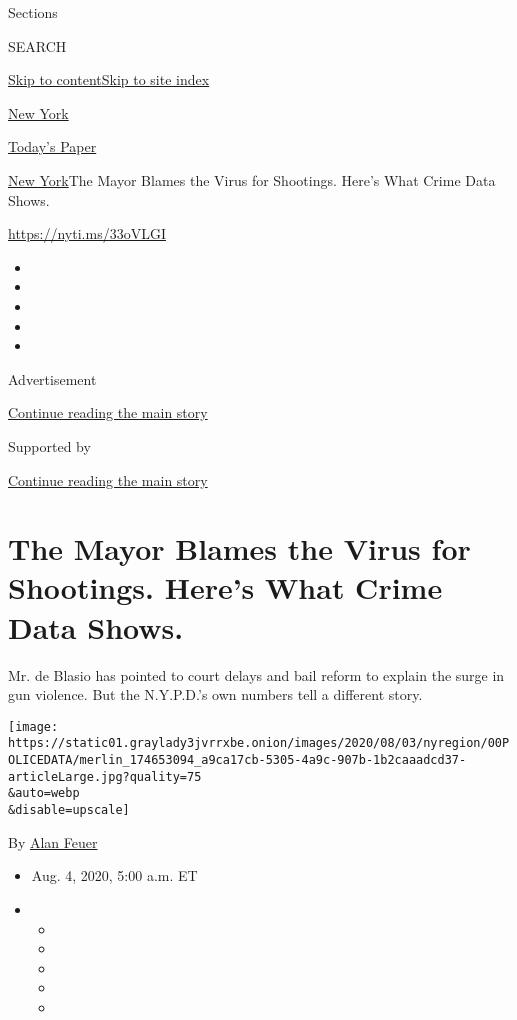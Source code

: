 Sections

SEARCH

\protect\hyperlink{site-content}{Skip to
content}\protect\hyperlink{site-index}{Skip to site index}

\href{https://www.nytimes3xbfgragh.onion/section/nyregion}{New York}

\href{https://myaccount.nytimes3xbfgragh.onion/auth/login?response_type=cookie\&client_id=vi}{}

\href{https://www.nytimes3xbfgragh.onion/section/todayspaper}{Today's
Paper}

\href{/section/nyregion}{New York}\textbar{}The Mayor Blames the Virus
for Shootings. Here's What Crime Data Shows.

\url{https://nyti.ms/33oVLGI}

\begin{itemize}
\item
\item
\item
\item
\item
\end{itemize}

Advertisement

\protect\hyperlink{after-top}{Continue reading the main story}

Supported by

\protect\hyperlink{after-sponsor}{Continue reading the main story}

\hypertarget{the-mayor-blames-the-virus-for-shootings-heres-what-crime-data-shows}{%
\section{The Mayor Blames the Virus for Shootings. Here's What Crime
Data
Shows.}\label{the-mayor-blames-the-virus-for-shootings-heres-what-crime-data-shows}}

Mr. de Blasio has pointed to court delays and bail reform to explain the
surge in gun violence. But the N.Y.P.D.'s own numbers tell a different
story.

\texttt{[image: https://static01.graylady3jvrrxbe.onion/images/2020/08/03/nyregion/00POLICEDATA/merlin\_174653094\_a9ca17cb-5305-4a9c-907b-1b2caaadcd37-articleLarge.jpg?quality=75\\\&auto=webp\\\&disable=upscale]}

By \href{https://www.nytimes3xbfgragh.onion/by/alan-feuer}{Alan Feuer}

\begin{itemize}
\item
  Aug. 4, 2020, 5:00 a.m. ET
\item
  \begin{itemize}
  \item
  \item
  \item
  \item
  \item
  \end{itemize}
\end{itemize}

